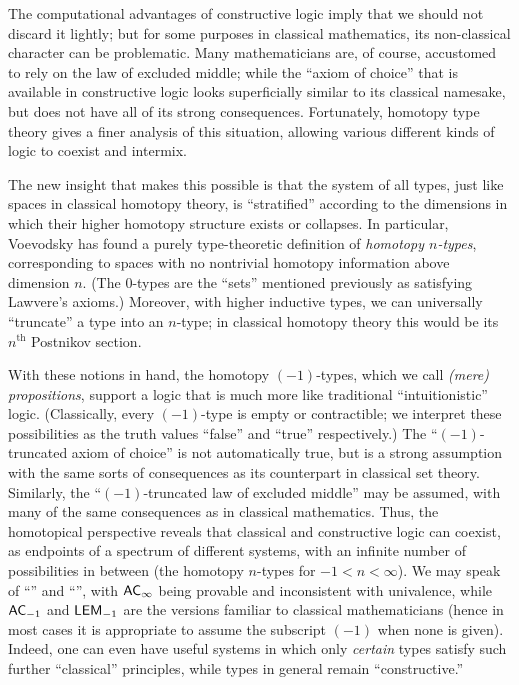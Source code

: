 The computational advantages of constructive logic imply that we should not  discard it lightly; but for some purposes in classical mathematics, its non-classical character can be problematic.
Many mathematicians are, of course, accustomed to rely on the law of excluded middle; while the ``axiom of choice'' that is available in constructive logic looks superficially similar to its classical namesake, but does not have all of its strong consequences.
Fortunately, homotopy type theory gives a finer analysis of this situation,  allowing various different kinds of logic to coexist and intermix.

The new insight that makes this possible is that the system of all types, just like spaces in classical homotopy theory, is ``stratified'' according to the dimensions in which their higher homotopy structure exists or collapses.
In particular, Voevodsky has found a purely type-theoretic definition of \emph{homotopy $n$-types}, corresponding to spaces with no nontrivial homotopy information above dimension $n$.
(The $0$-types are the ``sets'' mentioned previously as satisfying Lawvere's axioms.)
Moreover, with higher inductive types, we can universally ``truncate'' a type into an $n$-type; in classical homotopy theory this would be its $n^{\mathrm{th}}$ Postnikov section.

With these notions in hand, the homotopy $(-1)$-types, which we call \emph{(mere) propositions}, support a logic that is much more like traditional ``intuitionistic'' logic.
(Classically, every $(-1)$-type is empty or contractible; we interpret these possibilities as the truth values ``false'' and ``true'' respectively.)
The ``$(-1)$-truncated axiom of choice'' is not automatically true, but is a strong assumption with the same sorts of consequences as its counterpart in classical set theory.
Similarly, the ``$(-1)$-truncated law of excluded middle'' may be assumed, with many of the same consequences as in classical mathematics.
Thus, the homotopical perspective reveals that classical and constructive logic can coexist, as endpoints of a spectrum of different systems, with an infinite number of possibilities in between (the homotopy $n$-types for $-1 < n < \infty$).
We may speak of ``'' and ``'', with $\mathsf{AC}_{\infty}$ being provable and \LEM{\infty} inconsistent with univalence, while $\mathsf{AC}_{-1}$ and $\mathsf{LEM}_{-1}$ are the versions familiar to classical mathematicians (hence in most cases it is appropriate to assume the subscript $(-1)$ when none is given).  Indeed, one can even have useful systems in which only \emph{certain} types satisfy such further ``classical'' principles, while types in general remain ``constructive.''

